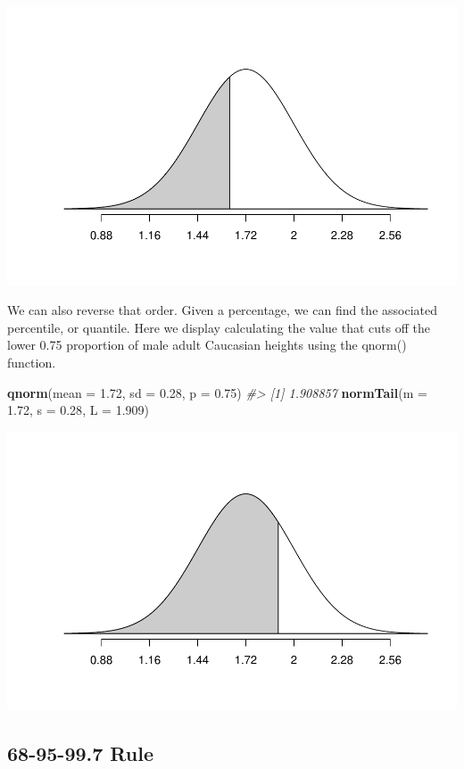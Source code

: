 \documentclass[
]{report}
\newenvironment{Shaded}{\begin{snugshade}}{\end{snugshade}}
\newcommand{\AttributeTok}[1]{\textcolor[rgb]{0.13,0.29,0.53}{#1}}
\newcommand{\CommentTok}[1]{\textcolor[rgb]{0.56,0.35,0.01}{\textit{#1}}}
\newcommand{\FloatTok}[1]{\textcolor[rgb]{0.00,0.00,0.81}{#1}}
\newcommand{\FunctionTok}[1]{\textcolor[rgb]{0.13,0.29,0.53}{\textbf{#1}}}
\newcommand{\NormalTok}[1]{#1}
\begin{document}
\begin{center}\includegraphics[width=0.6\linewidth]{04-VN04-1cat_theory_files/figure-latex/unnamed-chunk-1-1} \end{center}

\vspace{1mm}

We can also reverse that order. Given a percentage, we can find the associated percentile, or quantile. Here we display calculating the value that cuts off the lower 0.75 proportion of male adult Caucasian heights using the qnorm() function.

\begin{Shaded}
\begin{Highlighting}[]
\FunctionTok{qnorm}\NormalTok{(}\AttributeTok{mean =} \FloatTok{1.72}\NormalTok{, }\AttributeTok{sd =} \FloatTok{0.28}\NormalTok{, }\AttributeTok{p =} \FloatTok{0.75}\NormalTok{)}
\CommentTok{\#\textgreater{} [1] 1.908857}
\FunctionTok{normTail}\NormalTok{(}\AttributeTok{m =} \FloatTok{1.72}\NormalTok{, }\AttributeTok{s =} \FloatTok{0.28}\NormalTok{, }\AttributeTok{L =} \FloatTok{1.909}\NormalTok{)}
\end{Highlighting}
\end{Shaded}

\begin{center}\includegraphics[width=0.6\linewidth]{04-VN04-1cat_theory_files/figure-latex/unnamed-chunk-2-1} \end{center}

\subsection*{68-95-99.7 Rule}\label{rule}
\end{document}
